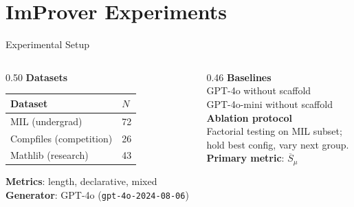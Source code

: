 \section{ImProver Experiments}

\begin{frame}{Experimental Setup}
\vspace{0.4em}
\begin{columns}[T]
\begin{column}{0.50\textwidth}
\textbf{Datasets}\\[0.4em]
\begin{tabular}{ll}
\toprule
\textbf{Dataset} & \textbf{$N$}\\
\midrule
MIL (undergrad) & 72\\
Compfiles (competition) & 26\\
Mathlib (research) & 43\\
\bottomrule
\end{tabular}
\vspace{0.4em}

\textbf{Metrics}: length, declarative, mixed\\[0.3em]
\textbf{Generator}: GPT-4o (\texttt{gpt-4o-2024-08-06})
\end{column}
\begin{column}{0.46\textwidth}
\textbf{Baselines}\\[0.4em]
GPT-4o without scaffold\\
GPT-4o-mini without scaffold\\[0.5em]
\textbf{Ablation protocol}\\[0.4em]
\small Factorial testing on MIL subset;\\
hold best config, vary next group.\\[0.4em]
\textbf{Primary metric}: $\overline{S}_\mu$
\end{column}
\end{columns}
\end{frame}

